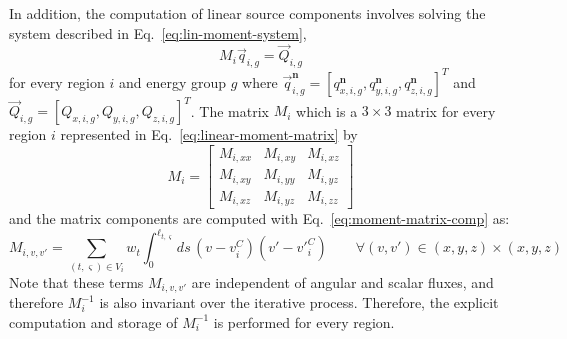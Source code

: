 In addition, the computation of linear source components involves solving the system described in Eq.~\ref{eq:lin-moment-system},
\begin{equation*}
M_i \vec{q}_{i,g} = \vec{Q}_{i,g}
\end{equation*}
for every region $i$ and energy group $g$ where $\vec{q}_{i,g}^{\mathbf{n}} = \left[q_{x,i,g}^{\mathbf{n}}, q_{y,i,g}^{\mathbf{n}}, q_{z,i,g}^{\mathbf{n}} \right]^T$ and $\vec{Q}_{i,g} = \left[Q_{x,i,g}, Q_{y,i,g}, Q_{z,i,g}\right]^T$. The matrix $M_i$ which is a $3 \times 3$ matrix for every region $i$ represented in Eq.~\ref{eq:linear-moment-matrix} by
\begin{equation*}
M_i = 
\begin{bmatrix}
M_{i,xx} & M_{i,xy}  & M_{i,xz} \\
M_{i,xy} & M_{i,yy}  & M_{i,yz} \\
M_{i,xz} & M_{i,yz}  & M_{i,zz}
\end{bmatrix}
\end{equation*}
and the matrix components are computed with Eq.~\ref{eq:moment-matrix-comp} as:
\begin{equation*}
M_{i,v,v'} = \sum_{(t,\varsigma) \in V_i} w_t  \int_{0}^{\ell_{t,\varsigma}} ds \, \left(v - v^C_i\right) \left( v' - {v'}^C_i \right) \qquad \forall (v,v') \in (x,y,z) \times (x,y,z)
\end{equation*}
Note that these terms $M_{i,v,v'}$ are independent of angular and scalar fluxes, and therefore $M_i^{-1}$ is also invariant over the iterative process. Therefore, the explicit computation and storage of $M_i^{-1}$ is performed for every region.

